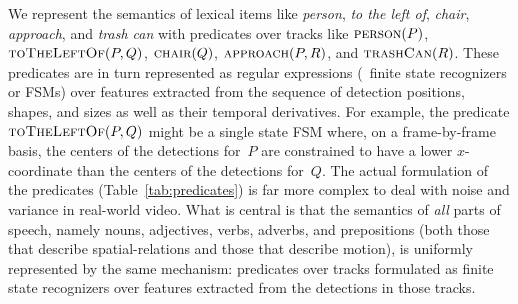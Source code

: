 We represent the semantics of lexical items like \emph{person}, \emph{to the
  left of}, \emph{chair}, \emph{approach}, and \emph{trash can} with predicates
over tracks like $\textsc{person}(P)$, $\textsc{toTheLeftOf}(P,Q)$,
$\textsc{chair}(Q)$, $\textsc{approach}(P,R)$, and $\textsc{trashCan}(R)$.
%
%
These predicates are in turn represented as regular expressions (\ie\ finite
state recognizers or FSMs) over features extracted from the sequence of
detection positions, shapes, and sizes as well as their temporal derivatives.
%
For example, the predicate $\textsc{toTheLeftOf}(P,Q)$ might be a single state
FSM where, on a frame-by-frame basis, the centers of the detections for~$P$ are
constrained to have a lower $x$-coordinate than the centers of the detections
for~$Q$.
%
The actual formulation of the predicates (Table~\ref{tab:predicates}) is far
more complex to deal with noise and variance in real-world video.
%
What is central is that the semantics of \emph{all} parts of speech, namely
nouns, adjectives, verbs, adverbs, and prepositions (both those that describe
spatial-relations and those that describe motion), is uniformly represented by
the same mechanism: predicates over tracks formulated as finite state
recognizers over features extracted from the detections in those tracks.

